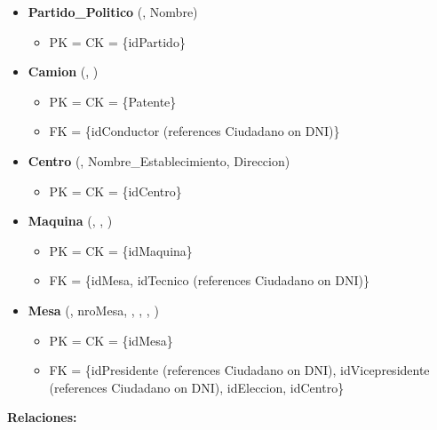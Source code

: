 \begin{itemize}
	\item \textbf{Partido\_Politico} (, Nombre) 
	\begin{itemize}
		\item PK = CK = \{idPartido\}
	\end{itemize}
	\vspace{1mm}

	\item \textbf{Camion} (, ) 
	\begin{itemize}
		\item PK = CK = \{Patente\}
		\item FK = \{idConductor (references Ciudadano on DNI)\}
	\end{itemize}
	\vspace{1mm}

	\item \textbf{Centro} (, Nombre\_Establecimiento, Direccion) 
	\begin{itemize}
		\item PK = CK = \{idCentro\}
	\end{itemize}
	\vspace{1mm}

	\item \textbf{Maquina} (, , ) 
	\begin{itemize}
		\item PK = CK = \{idMaquina\}
		\item FK = \{idMesa, idTecnico (references Ciudadano on DNI)\}
	\end{itemize}
	\vspace{1mm}

	\item \textbf{Mesa} (, nroMesa, , , , ) 
	\begin{itemize}
		\item PK = CK = \{idMesa\}
		\item FK = \{idPresidente (references Ciudadano on DNI), idVicepresidente (references Ciudadano on DNI), idEleccion, idCentro\}
	\end{itemize}
	\vspace{1mm}

\end{itemize}
		
\vspace{2mm}
\textbf{Relaciones:}
\vspace{1mm}

